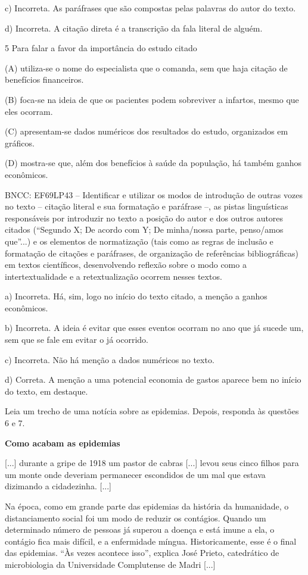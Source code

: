 \begin{itemize}
\begin{itemize}
\begin{escolha}
\begin{escolha}
\begin{escolha}
\begin{escolha}
\begin{escolha}
c) Incorreta. As paráfrases que são compostas pelas palavras do autor do
texto.

d) Incorreta. A citação direta é a transcrição da fala literal de
alguém.

\num {5} Para falar a favor da importância do estudo citado

(A) utiliza-se o nome do especialista que o comanda, sem que haja
citação de benefícios financeiros.

(B) foca-se na ideia de que os pacientes podem sobreviver a infartos,
mesmo que eles ocorram.

(C) apresentam-se dados numéricos dos resultados do estudo, organizados
em gráficos.

(D) mostra-se que, além dos benefícios à saúde da população, há também
ganhos econômicos.

BNCC: EF69LP43 -- Identificar e utilizar os modos de introdução de
outras vozes no texto -- citação literal e sua formatação e paráfrase
--, as pistas linguísticas responsáveis por introduzir no texto a
posição do autor e dos outros autores citados (``Segundo X; De acordo
com Y; De minha/nossa parte, penso/amos que''...) e os elementos de
normatização (tais como as regras de inclusão e formatação de citações e
paráfrases, de organização de referências bibliográficas) em textos
científicos, desenvolvendo reflexão sobre o modo como a
intertextualidade e a retextualização ocorrem nesses textos.

a) Incorreta. Há, sim, logo no início do texto citado, a menção a ganhos
econômicos.

b) Incorreta. A ideia é evitar que esses eventos ocorram no ano que já
sucede um, sem que se fale em evitar o já ocorrido.

c) Incorreta. Não há menção a dados numéricos no texto.

d) Correta. A menção a uma potencial economia de gastos aparece bem no
início do texto, em destaque.

Leia um trecho de uma notícia sobre as epidemias. Depois, responda às
questões 6 e 7.

\textbf{Como acabam as epidemias}

{[}...{]} durante a gripe de 1918 um pastor de cabras {[}...{]} levou
seus cinco filhos para um monte onde deveriam permanecer escondidos de
um mal que estava dizimando a cidadezinha. {[}...{]}

Na época, como em grande parte das epidemias da história da humanidade,
o distanciamento social foi um modo de reduzir os contágios. Quando um
determinado número de pessoas já superou a doença e está imune a ela, o
contágio fica mais difícil, e a enfermidade míngua. Historicamente, esse
é o final das epidemias. ``Às vezes acontece isso'', explica José
Prieto, catedrático de microbiologia da Universidade Complutense de
Madri {[}...{]}


\end{escolha}
\end{escolha}
\end{escolha}
\end{escolha}
\end{escolha}
\end{itemize}
\end{itemize}
